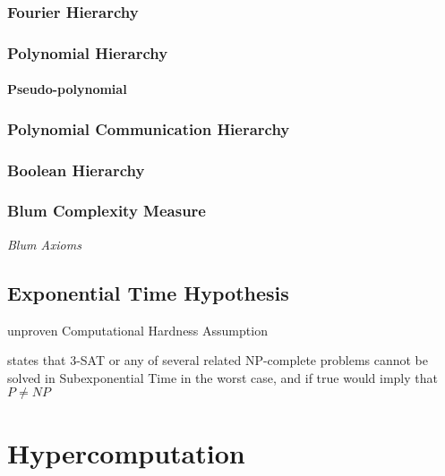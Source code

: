 \subsubsection{Fourier Hierarchy}

\subsubsection{Polynomial Hierarchy}

\paragraph{Pseudo-polynomial}\label{sec:pseudo_polynomial}\hfill

\subsubsection{Polynomial Communication Hierarchy}

\subsubsection{Boolean Hierarchy}




\subsubsection{Blum Complexity Measure}

\emph{Blum Axioms}



\subsection{Exponential Time Hypothesis}\label{sec:exponential_time_hypothesis}

unproven Computational Hardness Assumption

states that 3-SAT or any of several related NP-complete problems cannot be
solved in Subexponential Time in the worst case, and if true would imply that
$P \neq NP$



\section{Hypercomputation}\label{sec:hypercomputation}

